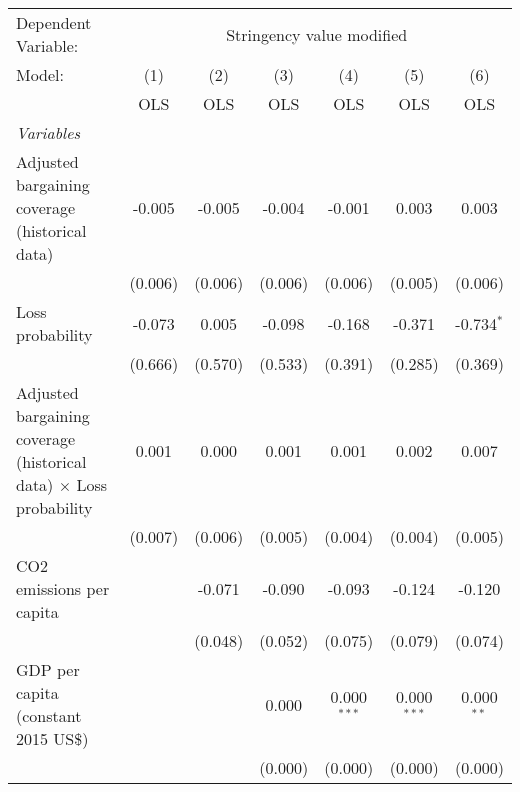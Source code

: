 
\begingroup
\centering
\begin{tabular}{lcccccc}
   \toprule
   Dependent Variable: & \multicolumn{6}{c}{Stringency value modified}\\
   Model:                                                                    & (1)     & (2)     & (3)     & (4)           & (5)           & (6)\\  
                                                                             &  OLS    & OLS     & OLS     & OLS           & OLS           & OLS\\  
   \midrule
   \emph{Variables}\\
   Adjusted bargaining coverage (historical data)                            & -0.005  & -0.005  & -0.004  & -0.001        & 0.003         & 0.003\\   
                                                                             & (0.006) & (0.006) & (0.006) & (0.006)       & (0.005)       & (0.006)\\   
   Loss probability                                                          & -0.073  & 0.005   & -0.098  & -0.168        & -0.371        & -0.734$^{*}$\\   
                                                                             & (0.666) & (0.570) & (0.533) & (0.391)       & (0.285)       & (0.369)\\   
   Adjusted bargaining coverage (historical data) $\times$ Loss probability  & 0.001   & 0.000   & 0.001   & 0.001         & 0.002         & 0.007\\   
                                                                             & (0.007) & (0.006) & (0.005) & (0.004)       & (0.004)       & (0.005)\\   
   CO2 emissions per capita                                                  &         & -0.071  & -0.090  & -0.093        & -0.124        & -0.120\\   
                                                                             &         & (0.048) & (0.052) & (0.075)       & (0.079)       & (0.074)\\   
   GDP per capita (constant 2015 US\$)                                       &         &         & 0.000   & 0.000$^{***}$ & 0.000$^{***}$ & 0.000$^{**}$\\   
                                                                             &         &         & (0.000) & (0.000)       & (0.000)       & (0.000)\\   

\end{tabular}
